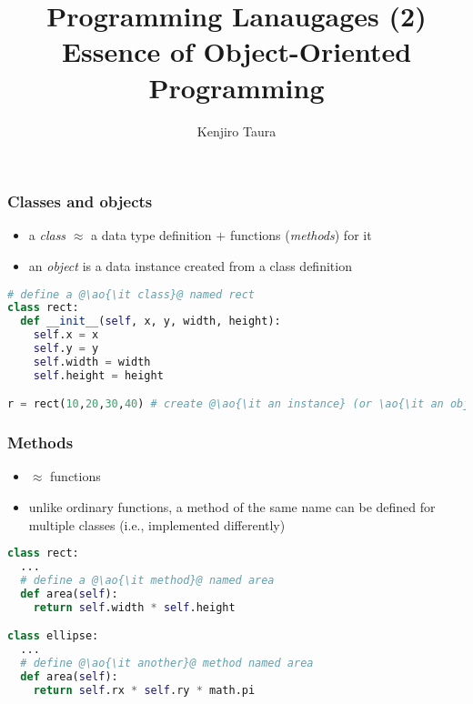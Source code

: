 \documentclass[12pt,dvipdfmx]{beamer}
\title{Programming Lanaugages (2) \\
Essence of Object-Oriented Programming}
\institute{}
\author{Kenjiro Taura}
\date{}
\newcommand{\ao}[1]{{\color{blue}#1}}
\begin{document}
\maketitle


\begin{frame}[fragile]
  \frametitle{Classes and objects}

  \begin{itemize}
  \item a \ao{\it class} $\approx$ a data type definition $+$
    functions (\ao{\it methods}) for it
  \item an \ao{\it object} is a data instance created from a class definition
  \end{itemize}

  \begin{center}
\begin{lstlisting}[language=python]
# define a @\ao{\it class}@ named rect
class rect:
  def __init__(self, x, y, width, height):
    self.x = x
    self.y = y
    self.width = width
    self.height = height

r = rect(10,20,30,40) # create @\ao{\it an instance} (or \ao{\it an object}) of rect@
\end{lstlisting}
  \end{center}
\end{frame}

\begin{frame}[fragile]
  \frametitle{Methods}
  \begin{itemize}
  \item $\approx$ functions
  \item unlike ordinary functions, a method of the same name can be defined
    for multiple classes (i.e., implemented differently)
  \end{itemize}

  \begin{center}
\begin{lstlisting}[language=python]
class rect:
  ...
  # define a @\ao{\it method}@ named area
  def area(self):
    return self.width * self.height

class ellipse:
  ...
  # define @\ao{\it another}@ method named area
  def area(self):
    return self.rx * self.ry * math.pi
  \end{lstlisting}
\end{center}
\end{frame}
\end{document}
